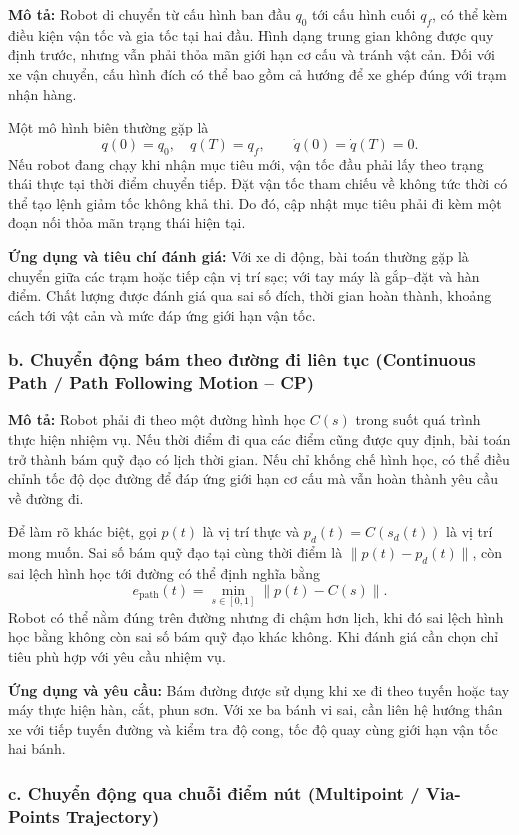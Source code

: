 \documentclass[12pt,a4paper,oneside]{report}
\begin{document}
\textbf{Mô tả:} Robot di chuyển từ cấu hình ban đầu \(q_0\) tới cấu hình cuối \(q_f\), có thể kèm điều kiện vận tốc và gia tốc tại hai đầu. Hình dạng trung gian không được quy định trước, nhưng vẫn phải thỏa mãn giới hạn cơ cấu và tránh vật cản. Đối với xe vận chuyển, cấu hình đích có thể bao gồm cả hướng để xe ghép đúng với trạm nhận hàng.

Một mô hình biên thường gặp là
\[
  q(0)=q_0,\quad q(T)=q_f,\qquad
  \dot q(0)=\dot q(T)=0.
\]
Nếu robot đang chạy khi nhận mục tiêu mới, vận tốc đầu phải lấy theo trạng thái thực tại thời điểm chuyển tiếp. Đặt vận tốc tham chiếu về không tức thời có thể tạo lệnh giảm tốc không khả thi. Do đó, cập nhật mục tiêu phải đi kèm một đoạn nối thỏa mãn trạng thái hiện tại.

\textbf{Ứng dụng và tiêu chí đánh giá:} Với xe di động, bài toán thường gặp là chuyển giữa các trạm hoặc tiếp cận vị trí sạc; với tay máy là gắp--đặt và hàn điểm. Chất lượng được đánh giá qua sai số đích, thời gian hoàn thành, khoảng cách tới vật cản và mức đáp ứng giới hạn vận tốc.

\subsubsection*{b. Chuyển động bám theo đường đi liên tục (Continuous Path / Path Following Motion -- CP)}

\textbf{Mô tả:} Robot phải đi theo một đường hình học \(C(s)\) trong suốt quá trình thực hiện nhiệm vụ. Nếu thời điểm đi qua các điểm cũng được quy định, bài toán trở thành bám quỹ đạo có lịch thời gian. Nếu chỉ khống chế hình học, có thể điều chỉnh tốc độ dọc đường để đáp ứng giới hạn cơ cấu mà vẫn hoàn thành yêu cầu về đường đi.

Để làm rõ khác biệt, gọi \(p(t)\) là vị trí thực và \(p_d(t)=C(s_d(t))\) là vị trí mong muốn. Sai số bám quỹ đạo tại cùng thời điểm là \(\|p(t)-p_d(t)\|\), còn sai lệch hình học tới đường có thể định nghĩa bằng
\[
  e_{\mathrm{path}}(t)=\min_{s\in[0,1]}\|p(t)-C(s)\|.
\]
Robot có thể nằm đúng trên đường nhưng đi chậm hơn lịch, khi đó sai lệch hình học bằng không còn sai số bám quỹ đạo khác không. Khi đánh giá cần chọn chỉ tiêu phù hợp với yêu cầu nhiệm vụ.

\textbf{Ứng dụng và yêu cầu:} Bám đường được sử dụng khi xe đi theo tuyến hoặc tay máy thực hiện hàn, cắt, phun sơn. Với xe ba bánh vi sai, cần liên hệ hướng thân xe với tiếp tuyến đường và kiểm tra độ cong, tốc độ quay cùng giới hạn vận tốc hai bánh.

\subsubsection*{c. Chuyển động qua chuỗi điểm nút (Multipoint / Via-Points Trajectory)}
\end{document}
